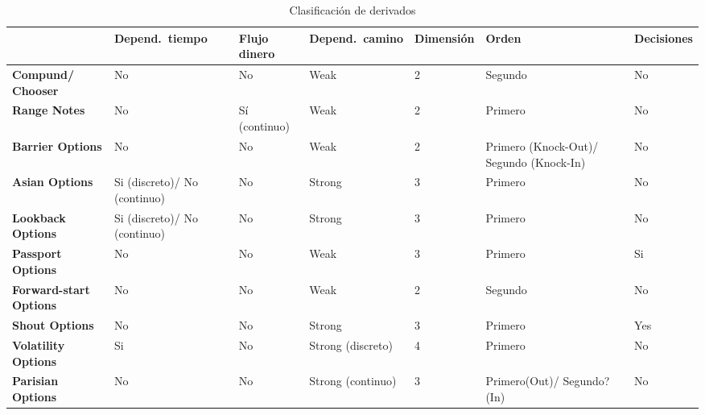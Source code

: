\begin{table}[H]
    \centering
    \begin{tabularx}{\linewidth}{|X|X|X|X|X|X|X|}
        \hline
        & \textbf{Depend.\ tiempo} & \textbf{Flujo dinero} & \textbf{Depend.\ camino} & \textbf{Dimensión} & \textbf{Orden} & \textbf{Decisiones} \\
        \hline
        \textbf{Compund/ Chooser} & No & No & Weak & 2 & Segundo & No \\
        \hline
        \textbf{Range Notes} & No & Sí (continuo) & Weak & 2 & Primero & No \\
        \hline
        \textbf{Barrier Options} & No & No & Weak & 2 & Primero (Knock-Out)/ Segundo (Knock-In) & No \\
        \hline
        \textbf{Asian Options} & Si (discreto)/ No (continuo) & No & Strong & 3 & Primero & No \\
        \hline
        \textbf{Lookback Options} & Si (discreto)/ No (continuo) & No & Strong & 3 & Primero & No \\
        \hline
        \textbf{Passport Options} & No & No & Weak & 3 & Primero & Si \\
        \hline
        \textbf{Forward-start Options} & No & No & Weak & 2 & Segundo & No \\
        \hline
        \textbf{Shout Options} & No & No & Strong & 3 & Primero & Yes \\
        \hline
        \textbf{Volatility Options} & Si & No & Strong (discreto) & 4 & Primero & No \\
        \hline
        \textbf{Parisian Options} & No & No & Strong (continuo) & 3 & Primero(Out)/ Segundo?(In) & No \\
        \hline
    \end{tabularx}
    \caption{Clasificación de derivados}
\end{table}








